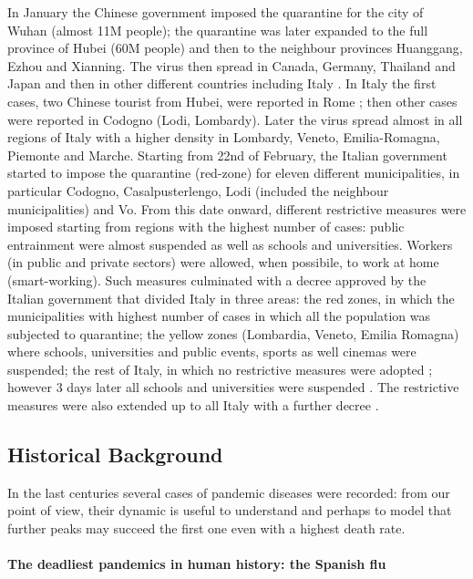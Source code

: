 \documentclass[
12pt, %
a4paper, %
oneside, %
headinclude,footinclude, %
BCOR5mm, %
]{scrartcl}
\begin{document}
In January the Chinese government imposed the quarantine for the city of Wuhan (almost 11M people); the quarantine was later expanded to the full province of Hubei (60M people) and then to the neighbour provinces Huanggang, Ezhou and Xianning. 
The virus then spread in Canada, Germany, Thailand and Japan and then in other different countries including Italy \cite{timeline+web}. In Italy the first cases, two Chinese tourist from Hubei, were reported in Rome \cite{corr+roma}; then  other cases were reported in Codogno (Lodi, Lombardy). Later the virus spread almost in all regions of Italy with a higher density in Lombardy, Veneto, Emilia-Romagna, Piemonte and Marche. Starting from 22nd of February, the Italian government started to impose the quarantine (red-zone) for eleven different municipalities, in particular Codogno, Casalpusterlengo, Lodi (included the neighbour municipalities) and Vo\textquotesingle. From this date onward, different restrictive measures were imposed starting from regions with the highest number of cases: public entrainment were almost suspended as well as schools and universities. Workers (in public and private sectors) were allowed, when possibile, to work at home (smart-working). Such measures culminated with a decree approved by the Italian government that divided Italy in three areas: the red zones, in which the municipalities with highest number of cases in which all the population was subjected to quarantine; the yellow zones (Lombardia, Veneto, Emilia Romagna) where schools, universities and public events, sports as well cinemas were suspended; the rest of Italy, in which no restrictive measures were adopted \cite{rep+dec1}; however 3 days later all schools and universities were suspended \cite{guard+01}. The restrictive measures were also extended up to all Italy with a further decree \cite{11marzo}. 

\subsection{Historical Background}



In the last centuries several cases of pandemic diseases were recorded: from our point of view, their dynamic is useful to understand and perhaps to model that further peaks may succeed the first one even with a highest death rate. 

\paragraph{The  deadliest pandemics in human history: the Spanish flu}
\end{document}
